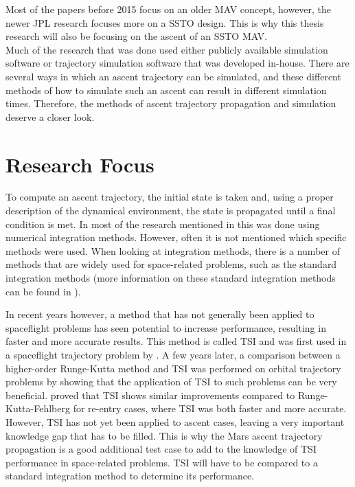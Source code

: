 \noindent
Most of the papers before 2015 focus on an older \ac{MAV} concept, however, the newer \ac{JPL} research focuses more on a \ac{SSTO} design. This is why this thesis research will also be focusing on the ascent of an \ac{SSTO} \ac{MAV}. \\
Much of the research that was done used either publicly available simulation software or trajectory simulation software that was developed in-house. There are several ways in which an ascent trajectory can be simulated, and these different methods of how to simulate such an ascent can result in different simulation times. Therefore, the methods of ascent trajectory propagation and simulation deserve a closer look.




\section{Research Focus}
\label{sec:researchFocus}
To compute an ascent trajectory, the initial state is taken and, using a proper description of the dynamical environment, the state is propagated until a final condition is met. In most of the research mentioned in  this was done using numerical integration methods. However, often it is not mentioned which specific methods were used. When looking at integration methods, there is a number of methods that are widely used for space-related problems, such as the standard integration methods (more information on these standard integration methods can be found in ). 

In recent years however, a method that has not generally been applied to spaceflight problems has seen potential to increase performance, resulting in faster and more accurate results. This method is called \acf{TSI} and was first used in a spaceflight trajectory problem by \cite{montenbruck1992numerical}. A few years later, a comparison between a higher-order Runge-Kutta method and \ac{TSI} was performed on orbital trajectory problems by \cite{scott2008high} showing that the application of \ac{TSI} to such problems can be very beneficial. \cite{bergsma2016application} proved that \ac{TSI} shows similar improvements compared to Runge-Kutta-Fehlberg for re-entry cases, where \ac{TSI} was both faster and more accurate. However, \ac{TSI} has not yet been applied to ascent cases, leaving a very important knowledge gap that has to be filled. This is why the Mars ascent trajectory propagation is a good additional test case to add to the knowledge of \ac{TSI} performance in space-related problems. \ac{TSI} will have to be compared to a standard integration method to determine its performance. 

